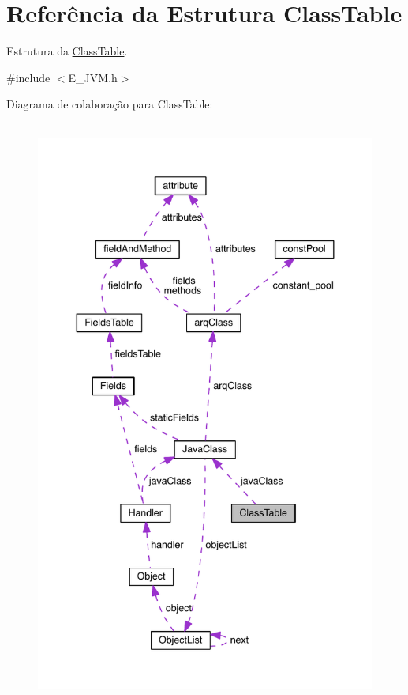 \hypertarget{struct_class_table}{}\section{Referência da Estrutura Class\+Table}
\label{struct_class_table}


Estrutura da \hyperlink{struct_class_table}{Class\+Table}.  




{\ttfamily \#include $<$E\+\_\+\+J\+V\+M.\+h$>$}



Diagrama de colaboração para Class\+Table\+:
\nopagebreak
\begin{figure}[H]
\begin{center}
\leavevmode
\includegraphics[height=550pt]{struct_class_table__coll__graph}
\end{center}
\end{figure}
